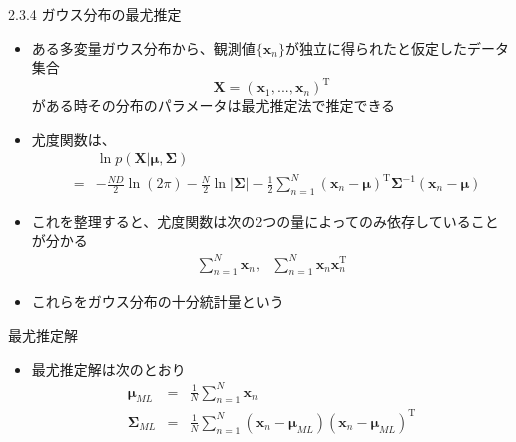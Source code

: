 \begin{frame}{2.3.4 ガウス分布の最尤推定}
 \begin{itemize}
  \item  ある多変量ガウス分布から、観測値$\{\bm{x}_n\}$が独立に得られたと仮定したデータ集合
         \begin{equation}
          \bm{X}=(\bm{x}_1,...,\bm{x}_n)^{\mathrm{T}}
         \end{equation}
         がある時その分布のパラメータは最尤推定法で推定できる
  \item 尤度関数は、
        \begin{eqnarray*}
         && \ln  p(\bm{X}|\bm{\mu}, \bm{\Sigma}) \\
         &=& -\frac{ND}{2}\ln (2\pi)-\frac{N}{2}\ln |\bm{\Sigma}|-\frac{1}{2}\sum_{n=1}^{N}(\bm{x}_n-\bm{\mu})^{\mathrm{T}}\bm{\Sigma}^{-1}(\bm{x}_n-\bm{\mu})
        \end{eqnarray*}
  \item これを整理すると、尤度関数は次の2つの量によってのみ依存していることが分かる
        \begin{eqnarray}
         \sum_{n=1}^{N}\bm{x}_n, \ \ \  \sum_{n=1}^{N}\bm{x}_n\bm{x}_n^{\mathrm{T}}
        \end{eqnarray}
  \item これらをガウス分布の\alert{十分統計量}という
 \end{itemize}
\end{frame}

\begin{frame}{最尤推定解}
 \begin{itemize}
  \item 最尤推定解は次のとおり
        \begin{eqnarray}
         \bm{\mu}_{ML} &=& \frac{1}{N}\sum_{n=1}^{N}\bm{x}_n\\
         \bm{\Sigma}_{ML}&=&\frac{1}{N}\sum_{n=1}^{N}(\bm{x}_n-\bm{\mu}_{ML})(\bm{x}_n-\bm{\mu}_{ML})^{\mathrm{T}}
        \end{eqnarray}
 \end{itemize}
\end{frame}

